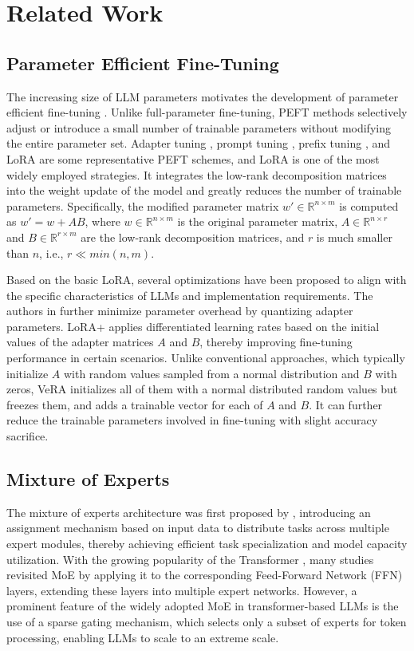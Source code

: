 \section{Related Work}
\label{sec:relatedwork}
\subsection{Parameter Efficient Fine-Tuning}
The increasing size of LLM parameters motivates the development of parameter efficient fine-tuning \cite{han2024parameter}. Unlike full-parameter fine-tuning, PEFT methods selectively adjust or introduce a small number of trainable parameters without modifying the entire parameter set. Adapter tuning \cite{houlsby2019parameter}, prompt tuning \cite{lester2021power}, prefix tuning \cite{li2021prefix}, and LoRA \cite{hulora} are some representative PEFT schemes, and LoRA is one of the most widely employed strategies. It integrates the low-rank decomposition matrices into the weight update of the model and greatly reduces the number of trainable parameters. Specifically, the modified parameter matrix $w'\in \mathbb{R}^{n\times m}$ is computed as $w'=w+AB$, where $w \in \mathbb{R}^{n\times m}$ is the original parameter matrix, $A\in \mathbb{R}^{n\times r}$ and $B \in \mathbb{R}^{r\times m}$ are the low-rank decomposition matrices, and $r$ is much smaller than $n$, i.e., $r\ll min(n,m)$. 

Based on the basic LoRA, several optimizations have been proposed to align with the specific characteristics of LLMs and implementation requirements. The authors in \cite{dettmers2024qlora} further minimize parameter overhead by quantizing adapter parameters. LoRA+ \cite{hayoulora} applies differentiated learning rates based on the initial values of the adapter matrices $A$ and $B$, thereby improving fine-tuning performance in certain scenarios. Unlike conventional approaches, which typically initialize $A$ with random values sampled from a normal distribution and $B$ with zeros, VeRA \cite{kopiczkovera} initializes all of them with a normal distributed random values but freezes them, and adds a trainable vector for each of $A$ and $B$. It can further reduce the trainable parameters involved in fine-tuning with slight accuracy sacrifice.

\subsection{Mixture of Experts}
The mixture of experts architecture was first proposed by \cite{jacobs1991adaptive}, introducing an assignment mechanism based on input data to distribute tasks across multiple expert modules, thereby achieving efficient task specialization and model capacity utilization. 
With the growing popularity of the Transformer \cite{vaswani2017attention}, many studies revisited MoE by applying it to the corresponding Feed-Forward Network (FFN) layers, extending these layers into multiple expert networks. However, a prominent feature of the widely adopted MoE in transformer-based LLMs is the use of a sparse gating mechanism, which selects only a subset of experts for token processing, enabling LLMs to scale to an extreme scale. 

